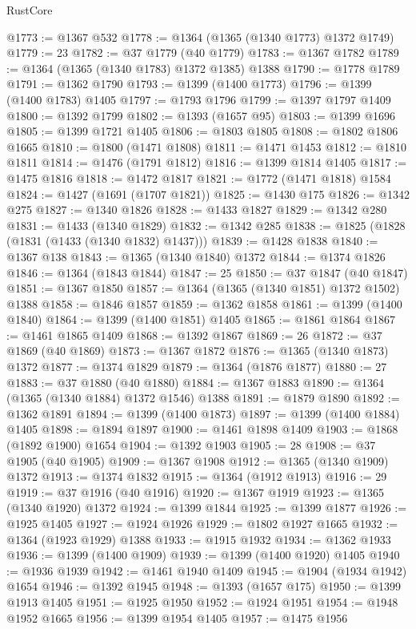 \begin{lexlean}{RustCore}
\begin{coremodule}
@1773 := @1367 @532
@1778 := @1364 (@1365 (@1340 @1773) @1372 @1749)
@1779 := 23
@1782 := @37 @1779 (@40 @1779)
@1783 := @1367 @1782
@1789 := @1364 (@1365 (@1340 @1783) @1372 @1385) @1388
@1790 := @1778 @1789
@1791 := @1362 @1790
@1793 := @1399 (@1400 @1773)
@1796 := @1399 (@1400 @1783) @1405
@1797 := @1793 @1796
@1799 := @1397 @1797 @1409
@1800 := @1392 @1799
@1802 := @1393 (@1657 @95)
@1803 := @1399 @1696
@1805 := @1399 @1721 @1405
@1806 := @1803 @1805
@1808 := @1802 @1806 @1665
@1810 := @1800 (@1471 @1808)
@1811 := @1471 @1453
@1812 := @1810 @1811
@1814 := @1476 (@1791 @1812)
@1816 := @1399 @1814 @1405
@1817 := @1475 @1816
@1818 := @1472 @1817
@1821 := @1772 (@1471 @1818) @1584
@1824 := @1427 (@1691 (@1707 @1821))
@1825 := @1430 @175
@1826 := @1342 @275
@1827 := @1340 @1826
@1828 := @1433 @1827
@1829 := @1342 @280
@1831 := @1433 (@1340 @1829)
@1832 := @1342 @285
@1838 := @1825 (@1828 (@1831 (@1433 (@1340 @1832) @1437)))
@1839 := @1428 @1838
@1840 := @1367 @138
@1843 := @1365 (@1340 @1840) @1372
@1844 := @1374 @1826
@1846 := @1364 (@1843 @1844)
@1847 := 25
@1850 := @37 @1847 (@40 @1847)
@1851 := @1367 @1850
@1857 := @1364 (@1365 (@1340 @1851) @1372 @1502) @1388
@1858 := @1846 @1857
@1859 := @1362 @1858
@1861 := @1399 (@1400 @1840)
@1864 := @1399 (@1400 @1851) @1405
@1865 := @1861 @1864
@1867 := @1461 @1865 @1409
@1868 := @1392 @1867
@1869 := 26
@1872 := @37 @1869 (@40 @1869)
@1873 := @1367 @1872
@1876 := @1365 (@1340 @1873) @1372
@1877 := @1374 @1829
@1879 := @1364 (@1876 @1877)
@1880 := 27
@1883 := @37 @1880 (@40 @1880)
@1884 := @1367 @1883
@1890 := @1364 (@1365 (@1340 @1884) @1372 @1546) @1388
@1891 := @1879 @1890
@1892 := @1362 @1891
@1894 := @1399 (@1400 @1873)
@1897 := @1399 (@1400 @1884) @1405
@1898 := @1894 @1897
@1900 := @1461 @1898 @1409
@1903 := @1868 (@1892 @1900) @1654
@1904 := @1392 @1903
@1905 := 28
@1908 := @37 @1905 (@40 @1905)
@1909 := @1367 @1908
@1912 := @1365 (@1340 @1909) @1372
@1913 := @1374 @1832
@1915 := @1364 (@1912 @1913)
@1916 := 29
@1919 := @37 @1916 (@40 @1916)
@1920 := @1367 @1919
@1923 := @1365 (@1340 @1920) @1372
@1924 := @1399 @1844
@1925 := @1399 @1877
@1926 := @1925 @1405
@1927 := @1924 @1926
@1929 := @1802 @1927 @1665
@1932 := @1364 (@1923 @1929) @1388
@1933 := @1915 @1932
@1934 := @1362 @1933
@1936 := @1399 (@1400 @1909)
@1939 := @1399 (@1400 @1920) @1405
@1940 := @1936 @1939
@1942 := @1461 @1940 @1409
@1945 := @1904 (@1934 @1942) @1654
@1946 := @1392 @1945
@1948 := @1393 (@1657 @175)
@1950 := @1399 @1913 @1405
@1951 := @1925 @1950
@1952 := @1924 @1951
@1954 := @1948 @1952 @1665
@1956 := @1399 @1954 @1405
@1957 := @1475 @1956

\end{coremodule}
\end{lexlean}
